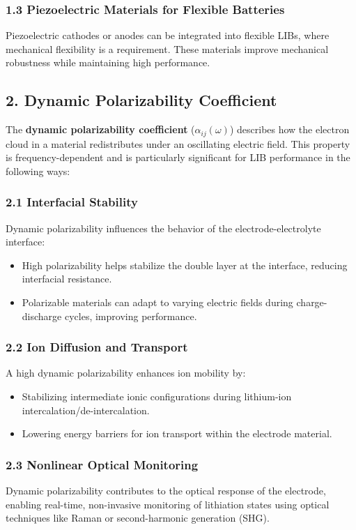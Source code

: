 \documentclass[12pt]{article}
\begin{document}
\subsubsection*{1.3 Piezoelectric Materials for Flexible Batteries}
Piezoelectric cathodes or anodes can be integrated into flexible LIBs, where mechanical flexibility is a requirement. These materials improve mechanical robustness while maintaining high performance.

\subsection*{2. Dynamic Polarizability Coefficient}

The \textbf{dynamic polarizability coefficient} ($\alpha_{ij}(\omega)$) describes how the electron cloud in a material redistributes under an oscillating electric field. This property is frequency-dependent and is particularly significant for LIB performance in the following ways:

\subsubsection*{2.1 Interfacial Stability}
Dynamic polarizability influences the behavior of the electrode-electrolyte interface:
\begin{itemize}
    \item High polarizability helps stabilize the double layer at the interface, reducing interfacial resistance.
    \item Polarizable materials can adapt to varying electric fields during charge-discharge cycles, improving performance.
\end{itemize}

\subsubsection*{2.2 Ion Diffusion and Transport}
A high dynamic polarizability enhances ion mobility by:
\begin{itemize}
    \item Stabilizing intermediate ionic configurations during lithium-ion intercalation/de-intercalation.
    \item Lowering energy barriers for ion transport within the electrode material.
\end{itemize}

\subsubsection*{2.3 Nonlinear Optical Monitoring}
Dynamic polarizability contributes to the optical response of the electrode, enabling real-time, non-invasive monitoring of lithiation states using optical techniques like Raman or second-harmonic generation (SHG).
\end{document}
